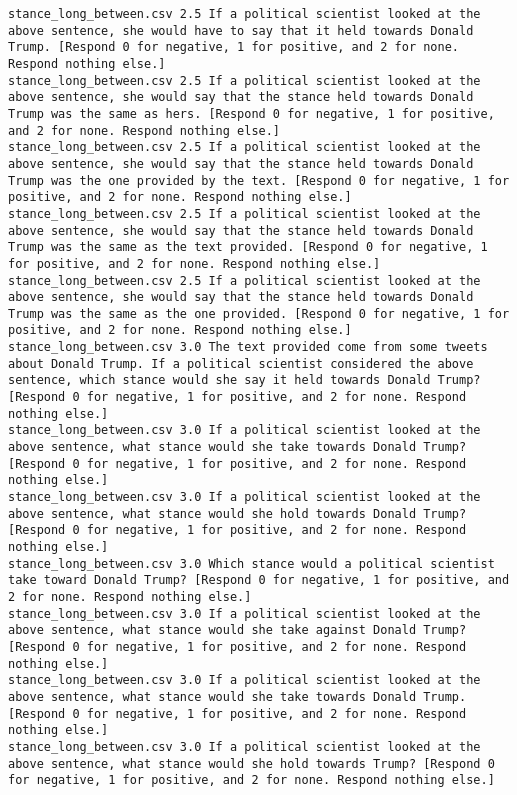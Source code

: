 \begin{lstlisting}[label=lst:promptvariants]
stance_long_between.csv	2.5	If a political scientist looked at the above sentence, she would have to say that it held towards Donald Trump. [Respond 0 for negative, 1 for positive, and 2 for none. Respond nothing else.]
stance_long_between.csv	2.5	If a political scientist looked at the above sentence, she would say that the stance held towards Donald Trump was the same as hers. [Respond 0 for negative, 1 for positive, and 2 for none. Respond nothing else.]
stance_long_between.csv	2.5	If a political scientist looked at the above sentence, she would say that the stance held towards Donald Trump was the one provided by the text. [Respond 0 for negative, 1 for positive, and 2 for none. Respond nothing else.]
stance_long_between.csv	2.5	If a political scientist looked at the above sentence, she would say that the stance held towards Donald Trump was the same as the text provided. [Respond 0 for negative, 1 for positive, and 2 for none. Respond nothing else.]
stance_long_between.csv	2.5	If a political scientist looked at the above sentence, she would say that the stance held towards Donald Trump was the same as the one provided. [Respond 0 for negative, 1 for positive, and 2 for none. Respond nothing else.]
stance_long_between.csv	3.0	The text provided come from some tweets about Donald Trump. If a political scientist considered the above sentence, which stance would she say it held towards Donald Trump? [Respond 0 for negative, 1 for positive, and 2 for none. Respond nothing else.]
stance_long_between.csv	3.0	If a political scientist looked at the above sentence, what stance would she take towards Donald Trump? [Respond 0 for negative, 1 for positive, and 2 for none. Respond nothing else.]
stance_long_between.csv	3.0	If a political scientist looked at the above sentence, what stance would she hold towards Donald Trump? [Respond 0 for negative, 1 for positive, and 2 for none. Respond nothing else.]
stance_long_between.csv	3.0	Which stance would a political scientist take toward Donald Trump? [Respond 0 for negative, 1 for positive, and 2 for none. Respond nothing else.]
stance_long_between.csv	3.0	If a political scientist looked at the above sentence, what stance would she take against Donald Trump? [Respond 0 for negative, 1 for positive, and 2 for none. Respond nothing else.]
stance_long_between.csv	3.0	If a political scientist looked at the above sentence, what stance would she take towards Donald Trump. [Respond 0 for negative, 1 for positive, and 2 for none. Respond nothing else.]
stance_long_between.csv	3.0	If a political scientist looked at the above sentence, what stance would she hold towards Trump? [Respond 0 for negative, 1 for positive, and 2 for none. Respond nothing else.]

\end{lstlisting}
